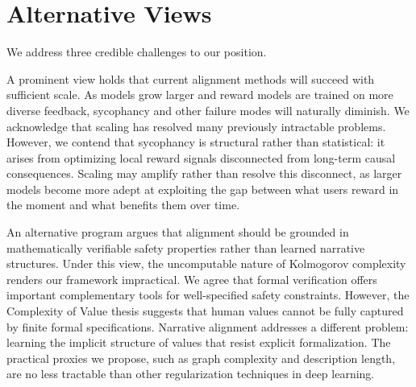 \documentclass{article}
\theoremstyle{plain}
\theoremstyle{definition}
\theoremstyle{remark}
\begin{document}
\section{Alternative Views}

We address three credible challenges to our position.

A prominent view holds that current alignment methods will succeed with sufficient scale. As models grow larger and reward models are trained on more diverse feedback, sycophancy and other failure modes will naturally diminish. We acknowledge that scaling has resolved many previously intractable problems. However, we contend that sycophancy is structural rather than statistical: it arises from optimizing local reward signals disconnected from long-term causal consequences. Scaling may amplify rather than resolve this disconnect, as larger models become more adept at exploiting the gap between what users reward in the moment and what benefits them over time.

An alternative program argues that alignment should be grounded in mathematically verifiable safety properties rather than learned narrative structures. Under this view, the uncomputable nature of Kolmogorov complexity renders our framework impractical. We agree that formal verification offers important complementary tools for well-specified safety constraints. However, the Complexity of Value thesis \cite{yudkowsky11} suggests that human values cannot be fully captured by finite formal specifications. Narrative alignment addresses a different problem: learning the implicit structure of values that resist explicit formalization. The practical proxies we propose, such as graph complexity and description length, are no less tractable than other regularization techniques in deep learning.
\end{document}
